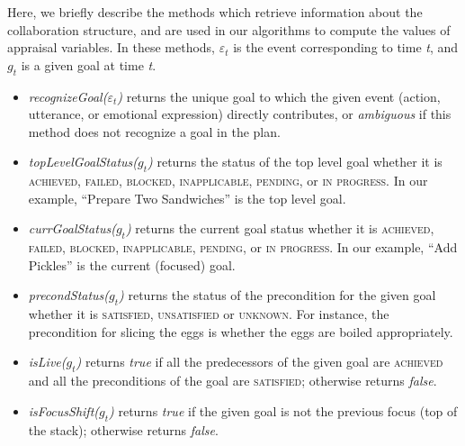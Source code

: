 \documentclass{article}
\begin{document}

Here, we briefly describe the methods which retrieve information about the
collaboration structure, and are used in our algorithms to compute the values of
appraisal variables. In these methods, $\varepsilon_t$ is the event
corresponding to time \textit{t}, and $g_t$ is a given goal at time \textit{t}.

\begin{itemize}[leftmargin=2pt]
  \setlength\itemsep{0.2mm}
  \item \textit{recognizeGoal($\varepsilon_t$)} returns the unique goal to which
  the given event (action, utterance, or emotional expression) directly
  contributes, or \textit{ambiguous} if this method does not recognize a goal in
  the plan.
  
  \item \textit{topLevelGoalStatus($g_t$)} returns the status of the top level
  goal whether it is \textsc{achieved, failed, blocked, inapplicable, pending,}
  or \textsc{in progress}.
  In our example, ``Prepare Two Sandwiches'' is the top level goal.
  
  \item \textit{currGoalStatus($g_t$)} returns the current goal status whether
  it is \textsc{achieved, failed, blocked, inapplicable, pending,} or \textsc{in
  progress}. In our example, ``Add Pickles'' is the current
  (focused) goal.
  
  \item \textit{precondStatus($g_t$)} returns the status of the precondition for
  the given goal whether it is \textsc{satisfied, unsatisfied} or
  \textsc{unknown}. For instance, the precondition for slicing the eggs is
  whether the eggs are boiled appropriately.
  
  \item \textit{isLive($g_t$)} returns \textit{true} if all the predecessors of
  the given goal are \textsc{achieved} and all the preconditions of the goal are
  \textsc{satisfied}; otherwise returns \textit{false}.
  
  \item \textit{isFocusShift($g_t$)} returns \textit{true} if the given
  goal is not the previous focus (top of the stack); otherwise returns
  \textit{false}.
  

\end{itemize}
\end{document}
